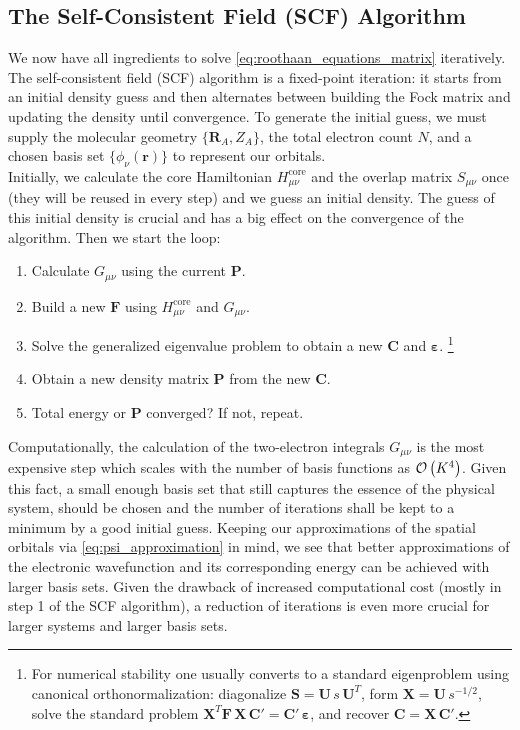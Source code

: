 \subsection{The Self-Consistent Field (SCF) Algorithm}
\label{subsec:background_hf_scf}
We now have all ingredients to solve \autoref{eq:roothaan_equations_matrix} iteratively. The self-consistent field (SCF) algorithm is a fixed-point iteration: it starts from an initial density guess and then alternates between building the Fock matrix and updating the density until convergence. To generate the initial guess, we must supply the molecular geometry $\{\mathbf R_A, Z_A\}$, the total electron count $N$, and a chosen basis set $\{\phi_\nu(\mathbf r)\}$ to represent our orbitals.\\

Initially, we calculate the core Hamiltonian $H_{\mu\nu}^\text{core}$ and the overlap matrix $S_{\mu\nu}$ once (they will be reused in every step) and we guess an initial density. The guess of this initial density is crucial and has a big effect on the convergence of the algorithm. Then we start the loop: 
\begin{enumerate}[itemsep=0.1em]
    \item Calculate $G_{\mu\nu}$ using the current $\mathbf{P}$.
    \item Build a new $\mathbf{F}$ using $H_{\mu\nu}^\text{core}$ and $G_{\mu\nu}$.
    \item Solve the generalized eigenvalue problem to obtain a new $\mathbf{C}$ and $\boldsymbol{\varepsilon}$. \footnote{For numerical stability one usually converts to a standard eigenproblem using canonical orthonormalization: diagonalize $\mathbf{S}=\mathbf{U}\,s\,\mathbf{U}^T$, form $\mathbf{X}=\mathbf{U}\,s^{-1/2}$, solve the standard problem $\mathbf{X}^T\mathbf{F}\,\mathbf{X}\,\mathbf{C}'=\mathbf{C}'\,\boldsymbol{\varepsilon}$, and recover $\mathbf{C}=\mathbf{X}\,\mathbf{C}'$.}
    \item Obtain a new density matrix $\mathbf{P}$ from the new $\mathbf{C}$.
    \item Total energy or $\mathbf{P}$ converged? If not, repeat.
\end{enumerate}

Computationally, the calculation of the two-electron integrals $G_{\mu\nu}$ is the most expensive step which scales with the number of basis functions as $\mathcal{O}\left(K^4\right)$. Given this fact, a small enough basis set that still captures the essence of the physical system, should be chosen and the number of iterations shall be kept to a minimum by a good initial guess. Keeping our approximations of the spatial orbitals via \autoref{eq:psi_approximation} in mind, we see that better approximations of the electronic wavefunction and its corresponding energy can be achieved with larger basis sets. Given the drawback of increased computational cost (mostly in step 1 of the SCF algorithm), a reduction of iterations is even more crucial for larger systems and larger basis sets.
